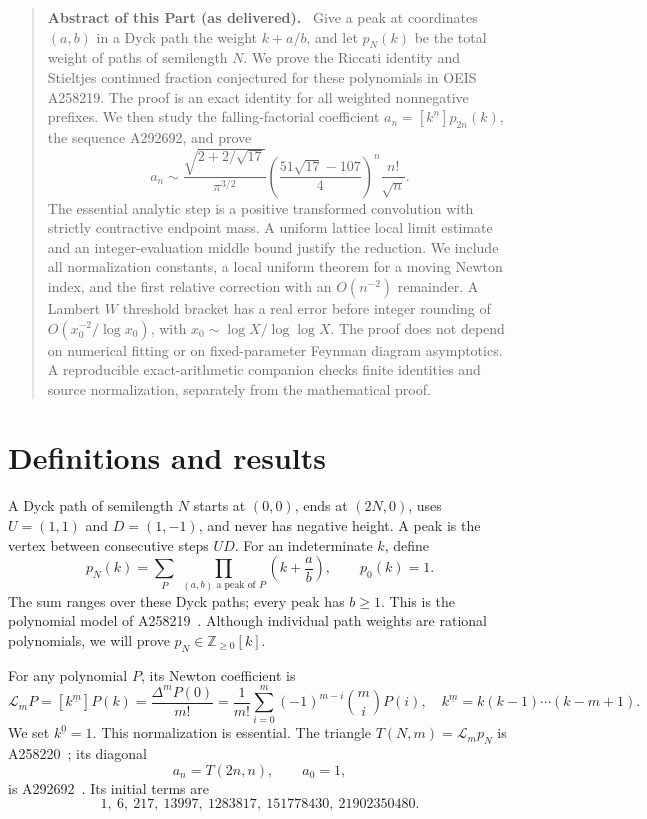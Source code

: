 \documentclass[11pt,letterpaper]{article}
\theoremstyle{remark}\newtheorem{remark}[theorem]{Remark}
\newcommand{\LL}{\mathcal L}
\newcommand{\fall}[2]{#1^{\underline{#2}}}
\newenvironment{partabstract}{\begin{quote}\small\noindent\textbf{Abstract of this Part (as delivered).}\ }{\end{quote}}
\begin{document}
\begin{partabstract}
Give a peak at coordinates $(a,b)$ in a Dyck path the weight $k+a/b$, and
let $p_N(k)$ be the total weight of paths of semilength $N$. We prove the
Riccati identity and Stieltjes continued fraction conjectured for these
polynomials in OEIS A258219. The proof is an exact identity for all weighted
nonnegative prefixes. We then study the falling-factorial coefficient
$a_n=[\fall{k}{n}]p_{2n}(k)$, the sequence A292692, and prove
\[
 a_n\sim\frac{\sqrt{2+2/\sqrt{17}}}{\pi^{3/2}}
 \left(\frac{51\sqrt{17}-107}{4}\right)^n\frac{n!}{\sqrt n}.
\]
The essential analytic step is a positive transformed convolution with
strictly contractive endpoint mass. A uniform lattice local limit estimate
and an integer-evaluation middle bound justify the reduction. We include
all normalization constants, a local uniform theorem for a moving Newton
index, and the first relative correction with an $O(n^{-2})$ remainder.
A Lambert $W$ threshold bracket has a real error before integer rounding
of $O(x_0^{-2}/\log x_0)$, with $x_0\sim\log X/\log\log X$. The proof
does not depend on numerical fitting or on fixed-parameter Feynman diagram
asymptotics. A reproducible exact-arithmetic companion checks finite identities
and source normalization, separately from the mathematical proof.
\end{partabstract}
\section{Definitions and results}
A Dyck path of semilength $N$ starts at $(0,0)$, ends at $(2N,0)$,
uses $U=(1,1)$ and $D=(1,-1)$, and never has negative height. A peak is the
vertex between consecutive steps $UD$. For an indeterminate $k$, define
\begin{equation}\label{wdn:dia:eq:path}
 p_N(k)=\sum_{P}\ \prod_{(a,b)\text{ a peak of }P}\left(k+\frac ab\right),
 \qquad p_0(k)=1.
\end{equation}
The sum ranges over these Dyck paths; every peak has $b\ge1$. This is the
polynomial model of A258219~\cite{A258219}. Although individual path weights
are rational polynomials, we will prove $p_N\in\mathbb Z_{\ge0}[k]$.

For any polynomial $P$, its Newton coefficient is
\begin{equation}\label{wdn:dia:eq:newtondef}
 \LL_mP=[\fall{k}{m}]P(k)=\frac{\Delta^mP(0)}{m!}
 =\frac1{m!}\sum_{i=0}^m(-1)^{m-i}\binom mi P(i),
 \quad \fall{k}{m}=k(k-1)\cdots(k-m+1).
\end{equation}
We set $\fall{k}{0}=1$. This normalization is essential. The triangle
$T(N,m)=\LL_mp_N$ is A258220~\cite{A258220}; its diagonal
\begin{equation}\label{wdn:dia:eq:diagonal}
 a_n=T(2n,n),\qquad a_0=1,
\end{equation}
is A292692~\cite{A292692}. Its initial terms are
\[
 1,\ 6,\ 217,\ 13997,\ 1283817,\ 151778430,\ 21902350480.
\]
\end{document}
